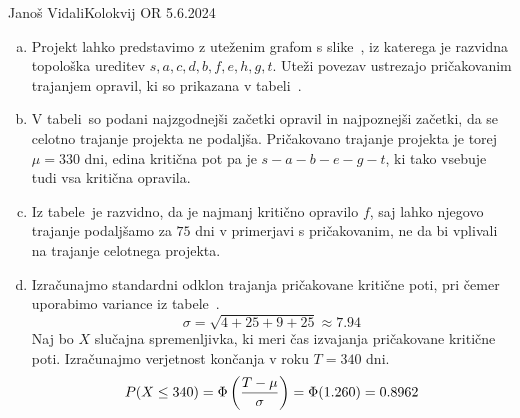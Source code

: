 \begin{naloga}{Janoš Vidali}{Kolokvij OR 5.6.2024}
\begin{odgovor}
\begin{enumerate}[(a)]
\item Projekt lahko predstavimo z uteženim grafom s slike~\fig,
iz katerega je raz\-vid\-na topološka ureditev
$s, a, c, d, b, f, e, h, g, t$.
Uteži povezav ustrezajo pričakovanim trajanjem opravil,
ki so prikazana v tabeli~.

\item V tabeli~
so podani najzgodnejši začetki opravil in najpoznejši začetki,
da se celotno trajanje projekta ne podaljša.
Pričakovano trajanje projekta je torej $\mu = 330$ dni,
edina kritična pot pa je $s - a - b - e - g - t$,
ki tako vsebuje tudi vsa kritična opravila.

\item Iz tabele~ je razvidno,
da je najmanj kritično opravilo $f$,
saj lahko njegovo trajanje
podaljšamo za $75$ dni v primerjavi s pričakovanim,
ne da bi vplivali na trajanje celotnega projekta.

\item Izračunajmo standardni odklon trajanja pričakovane kritične poti,
pri čemer uporabimo variance iz tabele~.
$$
\sigma = \sqrt{4 + 25 + 9 + 25} \approx 7.94
$$
Naj bo $X$ slučajna spremenljivka,
ki meri čas izvajanja pričakovane kritične poti.
Izračunajmo verjetnost končanja v roku $T = 340$ dni.
$$
P(X \le 340) = \Phi\left({T - \mu \over \sigma}\right) = \Phi(1.260) = 0.8962
$$
\end{enumerate}
%
\begin{slika}
\makebox[\textwidth][c]{
\pgfslika
}
\end{slika}
%
\begin{tabela}
\end{tabela}
\end{odgovor}
\end{naloga}
